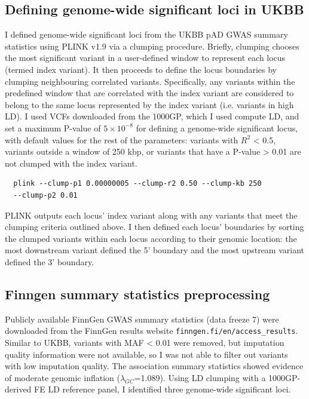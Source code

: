 \subsection{Defining genome-wide significant loci in UKBB}
I defined genome-wide significant loci from the UKBB pAD GWAS summary statistics using PLINK v1.9 via a clumping procedure. Briefly, clumping chooses the most significant variant in a user-defined window to represent each locus (termed index variant). It then proceeds to define the locus boundaries by clumping neighbouring correlated variants. Specifically, any variants within the predefined window that are correlated with the index variant are considered to belong to the same locus represented by the index variant (i.e. variants in high LD). I used VCFs downloaded from the 1000GP, which I used compute LD, and set a maximum P-value of $5\times10^{-8}$ for defining a genome-wide significant locus, with default values for the rest of the parameters: variants with $R^{2}$ < 0.5, variants outside a window of 250 kbp, or variants that have a P-value > 0.01 are not clumped with the index variant.
\begin{verbatim}
  plink --clump-p1 0.00000005 --clump-r2 0.50 --clump-kb 250 
  --clump-p2 0.01
\end{verbatim}

PLINK outputs each locus' index variant along with any variants that meet the clumping criteria outlined above. I then defined each locus' boundaries by sorting the clumped variants within each locus according to their genomic location: the most downstream variant defined the 5' boundary and the most upstream variant defined the 3' boundary. 

\subsection{Finngen summary statistics preprocessing}
Publicly available FinnGen GWAS summary statistics (data freeze 7) were downloaded from the FinnGen results website \Verb+finngen.fi/en/access_results+. Similar to UKBB, variants with MAF < 0.01 were removed, but imputation quality information were not available, so I was not able to filter out variants with low imputation quality. The association summary statistics showed evidence of moderate genomic inflation ($\lambda_{GC}$=1.089). Using LD clumping with a 1000GP-derived FE LD reference panel, I identified three genome-wide significant loci. 


